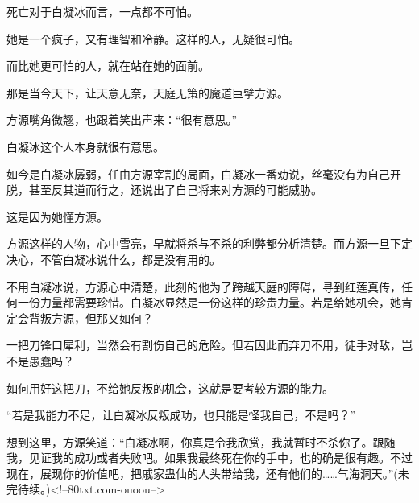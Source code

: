 \begin{this_body}
死亡对于白凝冰而言，一点都不可怕。

她是一个疯子，又有理智和冷静。这样的人，无疑很可怕。

而比她更可怕的人，就在站在她的面前。

那是当今天下，让天意无奈，天庭无策的魔道巨擘方源。

方源嘴角微翘，也跟着笑出声来：“很有意思。”

白凝冰这个人本身就很有意思。

如今是白凝冰孱弱，任由方源宰割的局面，白凝冰一番劝说，丝毫没有为自己开脱，甚至反其道而行之，还说出了自己将来对方源的可能威胁。

这是因为她懂方源。

方源这样的人物，心中雪亮，早就将杀与不杀的利弊都分析清楚。而方源一旦下定决心，不管白凝冰说什么，都是没有用的。

不用白凝冰说，方源心中清楚，此刻的他为了跨越天庭的障碍，寻到红莲真传，任何一份力量都需要珍惜。白凝冰显然是一份这样的珍贵力量。若是给她机会，她肯定会背叛方源，但那又如何？

一把刀锋口犀利，当然会有割伤自己的危险。但若因此而弃刀不用，徒手对敌，岂不是愚蠢吗？

如何用好这把刀，不给她反叛的机会，这就是要考较方源的能力。

“若是我能力不足，让白凝冰反叛成功，也只能是怪我自己，不是吗？”

想到这里，方源笑道：“白凝冰啊，你真是令我欣赏，我就暂时不杀你了。跟随我，见证我的成功或者失败吧。如果我最终死在你的手中，也的确是很有趣。不过现在，展现你的价值吧，把戚家蛊仙的人头带给我，还有他们的……气海洞天。”(未完待续。)<!--80txt.com-ouoou-->

\end{this_body}

